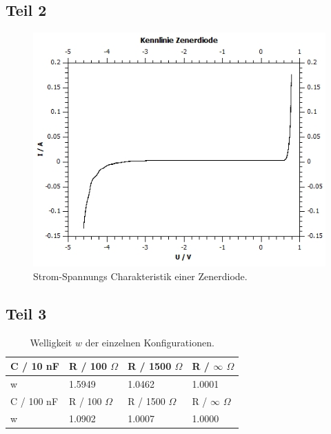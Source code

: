 \documentclass[12pt,a4paper,twoside]{article}
\begin{document}
\subsection{Teil 2}
\begin{figure}[H]
    \centering
    \includegraphics[width=0.6\linewidth]{nudes/2 plot.jpg}
    \caption{Strom-Spannungs Charakteristik einer Zenerdiode. }
    \label{fig:zus 2}
\end{figure}

\subsection{Teil 3}
\begin{table}[H]
    \centering
    \caption{Welligkeit $w$ der einzelnen Konfigurationen.}
    \label{tab:welligkeit zus}
    \begin{tabular}{| l | l | l | l |}
        \hline
        C / 10 nF & R / 100 $\Omega$ & R / 1500 $\Omega$ & R / $\infty$  $\Omega$ \\ 
        \hline
        w & 1.5949 & 1.0462 & 1.0001 \\
        \hline
        \hline
        C / 100 nF & R / 100 $\Omega$ & R / 1500 $\Omega$ & R / $\infty$ $\Omega$ \\ 
        \hline
        w & 1.0902 & 1.0007 & 1.0000 \\
        \hline
    \end{tabular}
\end{table}
\end{document}
